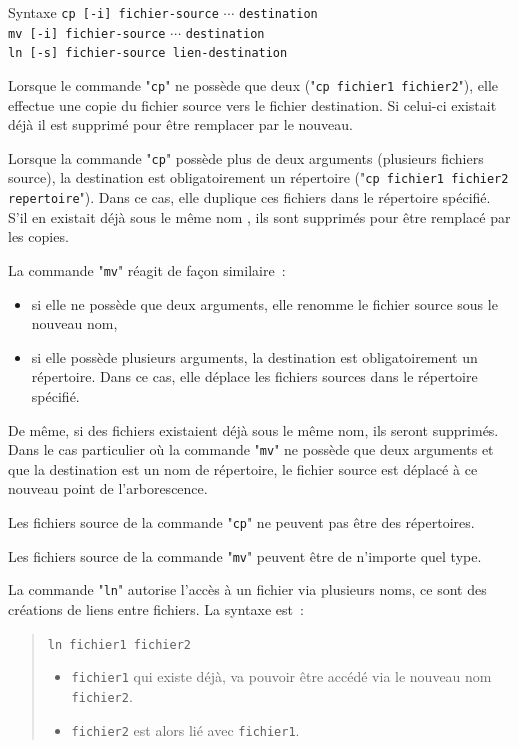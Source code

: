 \begin{definition}{Syntaxe}
{\tt cp [-i] fichier-source} $\cdots$ {\tt destination}\\
{\tt mv [-i] fichier-source} $\cdots$ {\tt destination}\\
{\tt ln [-s] fichier-source lien-destination}
\end{definition}

Lorsque le commande "{\tt cp}" ne poss{\`e}de que deux ("{\tt cp fichier1
fichier2}"), elle effectue une copie du fichier source vers le fichier
destination. Si celui-ci existait d{\'e}j{\`a} il est supprim{\'e} pour {\^e}tre
remplacer par le nouveau.

Lorsque la commande "{\tt cp}" poss{\`e}de plus de deux arguments
(plusieurs fichiers source), la destination est obligatoirement un
r{\'e}pertoire ("{\tt cp fichier1 fichier2 repertoire}"). Dans ce cas,
elle duplique ces fichiers dans le r{\'e}pertoire sp{\'e}cifi{\'e}. S'il en existait
d{\'e}j{\`a} sous le m{\^e}me nom , ils sont supprim{\'e}s pour {\^e}tre remplac{\'e} par les
copies.

La commande "{\tt mv}" r{\'e}agit de fa\c{c}on similaire~:
\begin{itemize}
	\item	si elle ne poss{\`e}de que deux arguments, elle renomme le fichier
			source sous le nouveau nom,
	\item	si elle poss{\`e}de plusieurs arguments, la destination est
			obligatoirement un r{\'e}pertoire. Dans ce cas, elle d{\'e}place les
			fichiers sources dans le r{\'e}pertoire sp{\'e}cifi{\'e}.
\end{itemize}

De m{\^e}me, si des fichiers existaient d{\'e}j{\`a} sous le m{\^e}me nom, ils seront
supprim{\'e}s. Dans le cas particulier o{\`u} la commande "{\tt mv}" ne
poss{\`e}de que deux arguments et que la destination est un nom de
r{\'e}pertoire, le fichier source est d{\'e}plac{\'e} {\`a} ce nouveau point de
l'arborescence.

Les fichiers source de la commande "{\tt cp}" ne peuvent pas {\^e}tre des
r{\'e}pertoires.

Les fichiers source de la commande "{\tt mv}" peuvent {\^e}tre de
n'importe quel type.

La commande "{\tt ln}" autorise l'acc{\`e}s
{\`a} un fichier via plusieurs noms, ce sont des cr{\'e}ations de liens
entre fichiers. La syntaxe est~:
\begin{quote}
\begin{center}
{\tt ln fichier1 fichier2}
\end{center}
\begin{itemize}
	\item {\tt fichier1} qui existe d{\'e}j{\`a}, va pouvoir {\^e}tre acc{\'e}d{\'e} via
		le nouveau nom {\tt fichier2}.
	\item {\tt fichier2} est alors li{\'e} avec {\tt fichier1}.
\end{itemize}
\end{quote}

